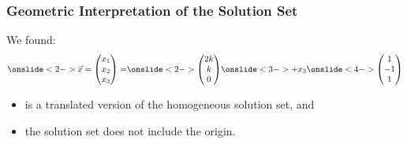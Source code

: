 \begin{frame}
    \frametitle{Geometric Interpretation of the Solution Set}
    We found:
\begin{align*}
    \onslide<2->{\vec{x} 
        = \begin{pmatrix} x_1\\x_2\\x_3 \end{pmatrix} 
        = }
        \onslide<2->{ \begin{pmatrix} 2k \\ k \\ 0 \end{pmatrix}} \onslide<3->{+ x_3 }\onslide<4->{\begin{pmatrix} 1 \\ -1 \\ 1 \end{pmatrix}}
\end{align*}    
    \begin{itemize}
        \item<6-> is a translated version of the homogeneous solution set, and
        \item<7-> the solution set does not include the origin. 
    \end{itemize}

    \vspace{4pt}
\end{frame}



